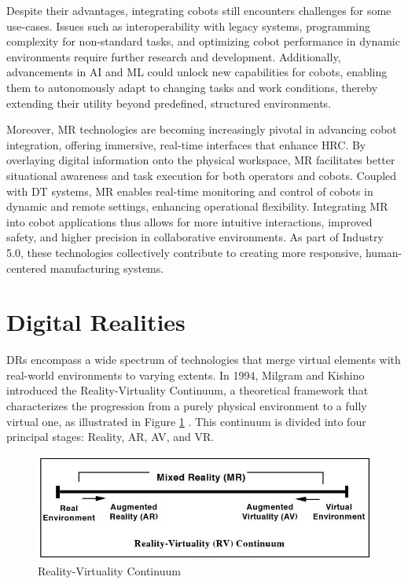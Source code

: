 Despite their advantages, integrating cobots still encounters challenges for some use-cases. Issues such as interoperability with legacy systems, programming complexity for non-standard tasks, and optimizing cobot performance in dynamic environments require further research and development. Additionally, advancements in \ac{AI} and \ac{ML} could unlock new capabilities for cobots, enabling them to autonomously adapt to changing tasks and work conditions, thereby extending their utility beyond predefined, structured environments.

Moreover, \ac{MR} technologies are becoming increasingly pivotal in advancing cobot integration, offering immersive, real-time interfaces that enhance \ac{HRC}. By overlaying digital information onto the physical workspace, \ac{MR} facilitates better situational awareness and task execution for both operators and cobots. Coupled with \ac{DT} systems, \ac{MR} enables real-time monitoring and control of cobots in dynamic and remote settings, enhancing operational flexibility. Integrating \ac{MR} into cobot applications thus allows for more intuitive interactions, improved safety, and higher precision in collaborative environments. As part of Industry 5.0, these technologies collectively contribute to creating more responsive, human-centered manufacturing systems.

\section{Digital Realities} 
\ac{DRs} encompass a wide spectrum of technologies that merge virtual elements with real-world environments to varying extents. In 1994, Milgram and Kishino introduced the Reality-Virtuality Continuum, a theoretical framework that characterizes the progression from a purely physical environment to a fully virtual one, as illustrated in Figure \ref{f:real-virtual-continuum} \cite{milgram1994}.
This continuum is divided into four principal stages: Reality, \ac{AR}, \ac{AV}, and \ac{VR}.

\begin{figure}[h]
    \centering
    \includegraphics[width=0.7\linewidth]{figs/vr-continuum.png}
    \caption{Reality-Virtuality Continuum~\cite{milgram1994}}
    \label{f:real-virtual-continuum}
\end{figure}

